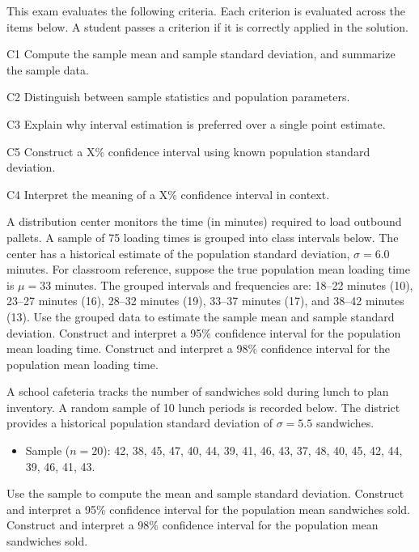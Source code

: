 


	This exam evaluates the following criteria. Each criterion is evaluated across the items below. A student passes a criterion if it is correctly applied in the solution.
	\begin{ExamCriteria}
		\item C1 Compute the sample mean and sample standard deviation, and summarize the sample data.
		\item C2 Distinguish between sample statistics and population parameters.
		\item C3 Explain why interval estimation is preferred over a single point estimate.
		\item C5 Construct a X\% confidence interval using known population standard deviation.
		\item C4 Interpret the meaning of a X\% confidence interval in context.
	\end{ExamCriteria}
	\begin{ExamProblems}
		\item A distribution center monitors the time (in minutes) required to load outbound pallets.
		A sample of 75 loading times is grouped into class intervals below. The center has a historical estimate of the population standard deviation, \(\sigma = 6.0\) minutes.
		For classroom reference, suppose the true population mean loading time is \(\mu = 33\) minutes.
		The grouped intervals and frequencies are: 18--22 minutes (10), 23--27 minutes (16), 28--32 minutes (19), 33--37 minutes (17), and 38--42 minutes (13).
		Use the grouped data to estimate the sample mean and sample standard deviation.
		Construct and interpret a 95\% confidence interval for the population mean loading time.
		Construct and interpret a 98\% confidence interval for the population mean loading time.

		\item A school cafeteria tracks the number of sandwiches sold during lunch to plan inventory.
		A random sample of 10 lunch periods is recorded below. The district provides a historical population standard deviation of \(\sigma = 5.5\) sandwiches.

		\begin{itemize}
			\item Sample (\(n = 20\)): 42, 38, 45, 47, 40, 44, 39, 41, 46, 43, 37, 48, 40, 45, 42, 44, 39, 46, 41, 43.
		\end{itemize}

		Use the sample to compute the mean and sample standard deviation.
		Construct and interpret a 95\% confidence interval for the population mean sandwiches sold.
		Construct and interpret a 98\% confidence interval for the population mean sandwiches sold.

	\end{ExamProblems}

